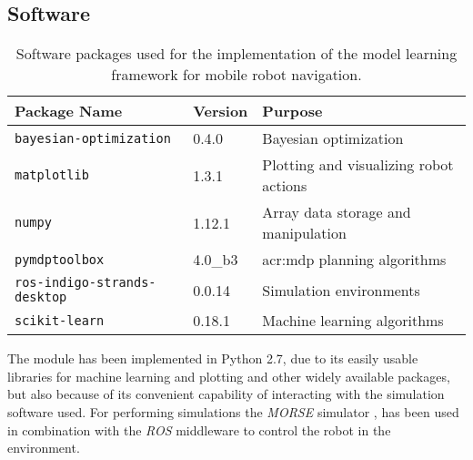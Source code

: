 \subsection{Software}
\label{sec:software}

\begin{table}[pt]
\caption{Software packages used for the implementation of the model learning framework for mobile robot navigation.}
\label{tab:software-packages}\centering
\begin{tabular}{lll}
	\hline%
	\textbf{Package Name} & \textbf{Version} & \textbf{Purpose} \\
	\hline
	\texttt{bayesian-optimization} & 0.4.0 & Bayesian optimization \\
	\texttt{matplotlib} & 1.3.1 & Plotting and visualizing robot actions \\
	\texttt{numpy} & 1.12.1 & Array data storage and manipulation\\ 
	\texttt{pymdptoolbox} & 4.0\_b3 & \acrshort{acr:mdp} planning algorithms \\
	\texttt{ros-indigo-strands-desktop} & 0.0.14 & Simulation environments\\
	\texttt{scikit-learn} & 0.18.1 & Machine learning algorithms \\ \hline
\end{tabular}
\end{table}

The module has been implemented in Python 2.7, due to its easily usable libraries for machine learning and plotting and other widely available packages, but also because of its convenient capability of interacting with the simulation software used.
For performing simulations the \textit{MORSE} simulator \cite{morse_simpar_2012}, has been used in combination with the \textit{ROS} middleware to control the robot in the environment.

\vspace{12pt}
\noindent{}


